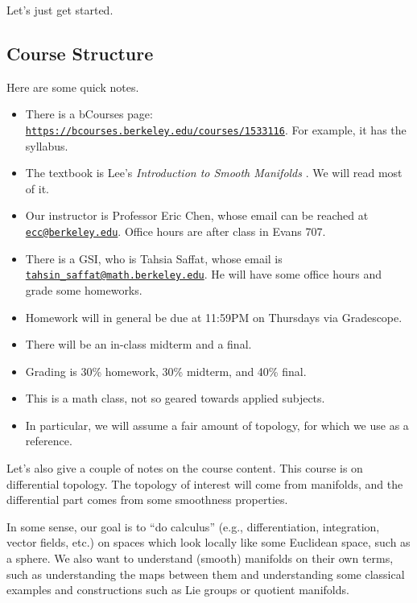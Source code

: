 \documentclass[../notes.tex]{subfiles}
\begin{document}
Let's just get started.

\subsection{Course Structure}
Here are some quick notes.
\begin{itemize}
	\item There is a bCourses page: \href{https://bcourses.berkeley.edu/courses/1533116}{\texttt{https://bcourses.berkeley.edu/courses/1533116}}. For example, it has the syllabus.
	\item The textbook is Lee's \textit{Introduction to Smooth Manifolds} \cite{lee-manifolds}. We will read most of it.
	\item Our instructor is Professor Eric Chen, whose email can be reached at \href{mailto:ecc@berkeley.edu}{\texttt{ecc@berkeley.edu}}. Office hours are after class in Evans 707.
	\item There is a GSI, who is Tahsia Saffat, whose email is \href{mailto:tahsin_saffat@math.berkeley.edu}{\texttt{tahsin\_saffat@math.berkeley.edu}}. He will have some office hours and grade some homeworks.
	\item Homework will in general be due at 11:59PM on Thursdays via Gradescope.
	\item There will be an in-class midterm and a final.
	\item Grading is 30\% homework, 30\% midterm, and 40\% final.
	\item This is a math class, not so geared towards applied subjects.
	\item In particular, we will assume a fair amount of topology, for which we use \cite{elber-top} as a reference.
\end{itemize}
Let's also give a couple of notes on the course content. This course is on differential topology. The topology of interest will come from manifolds, and the differential part comes from some smoothness properties.

In some sense, our goal is to ``do calculus'' (e.g., differentiation, integration, vector fields, etc.) on spaces which look locally like some Euclidean space, such as a sphere. We also want to understand (smooth) manifolds on their own terms, such as understanding the maps between them and understanding some classical examples and constructions such as Lie groups or quotient manifolds.
\end{document}
